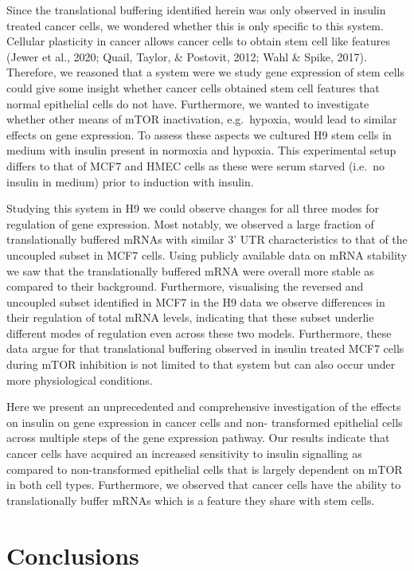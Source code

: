\documentclass[12pt,openany]{book}
\begin{document}
Since the translational buffering identified herein was only observed in
insulin treated cancer cells, we wondered whether this is only specific
to this system. Cellular plasticity in cancer allows cancer cells to
obtain stem cell like features (Jewer et al., 2020; Quail, Taylor, \&
Postovit, 2012; Wahl \& Spike, 2017). Therefore, we reasoned that a
system were we study gene expression of stem cells could give some
insight whether cancer cells obtained stem cell features that normal
epithelial cells do not have. Furthermore, we wanted to investigate
whether other means of mTOR inactivation, e.g.~hypoxia, would lead to
similar effects on gene expression. To assess these aspects we cultured
H9 stem cells in medium with insulin present in normoxia and hypoxia.
This experimental setup differs to that of MCF7 and HMEC cells as these
were serum starved (i.e.~no insulin in medium) prior to induction with
insulin.

Studying this system in H9 we could observe changes for all three modes
for regulation of gene expression. Most notably, we observed a large
fraction of translationally buffered mRNAs with similar 3' UTR
characteristics to that of the uncoupled subset in MCF7 cells. Using
publicly available data on mRNA stability we saw that the
translationally buffered mRNA were overall more stable as compared to
their background. Furthermore, visualising the reversed and uncoupled
subset identified in MCF7 in the H9 data we observe differences in their
regulation of total mRNA levels, indicating that these subset underlie
different modes of regulation even across these two models. Furthermore,
these data argue for that translational buffering observed in insulin
treated MCF7 cells during mTOR inhibition is not limited to that system
but can also occur under more physiological conditions.

Here we present an unprecedented and comprehensive investigation of the
effects on insulin on gene expression in cancer cells and non-
transformed epithelial cells across multiple steps of the gene
expression pathway. Our results indicate that cancer cells have acquired
an increased sensitivity to insulin signalling as compared to
non-transformed epithelial cells that is largely dependent on mTOR in
both cell types. Furthermore, we observed that cancer cells have the
ability to translationally buffer mRNAs which is a feature they share
with stem cells.

\chapter{Conclusions}
\end{document}
